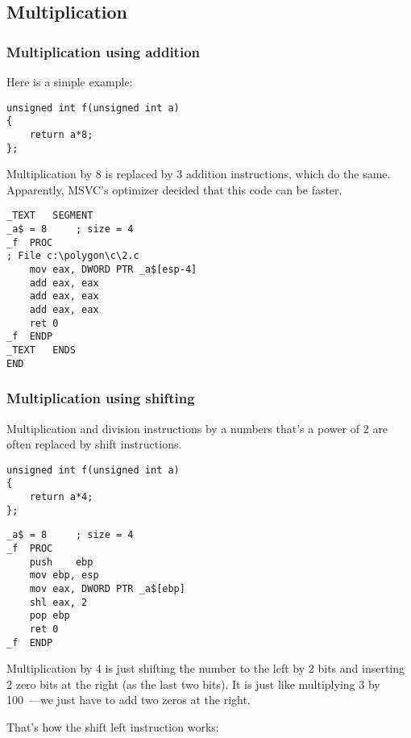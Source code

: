 ﻿\subsection{Multiplication}

\subsubsection{Multiplication using addition}

Here is a simple example:

\begin{lstlisting}[caption=\Optimizing MSVC 2010]
unsigned int f(unsigned int a)
{
	return a*8;
};
\end{lstlisting}

Multiplication by 8 is replaced by 3 addition instructions, which do the same.
Apparently, MSVC's optimizer decided that this code can be faster.

\begin{lstlisting}
_TEXT	SEGMENT
_a$ = 8		; size = 4
_f	PROC
; File c:\polygon\c\2.c
	mov	eax, DWORD PTR _a$[esp-4]
	add	eax, eax
	add	eax, eax
	add	eax, eax
	ret	0
_f	ENDP
_TEXT	ENDS
END
\end{lstlisting}

\subsubsection{Multiplication using shifting}
\label{subsec:mult_using_shifts}

Multiplication and division instructions by a numbers that's a power of 2 are often replaced by shift instructions.

\begin{lstlisting}
unsigned int f(unsigned int a)
{
	return a*4;
};
\end{lstlisting}

\begin{lstlisting}[caption=\NonOptimizing MSVC 2010]
_a$ = 8		; size = 4
_f	PROC
	push	ebp
	mov	ebp, esp
	mov	eax, DWORD PTR _a$[ebp]
	shl	eax, 2
	pop	ebp
	ret	0
_f	ENDP
\end{lstlisting}


Multiplication by 4 is just shifting the number to the left by 2 bits
and inserting 2 zero bits at the right (as the last two bits).
It is just like multiplying 3 by 100~---we just have to add two zeros at the right.

That's how the shift left instruction works:



